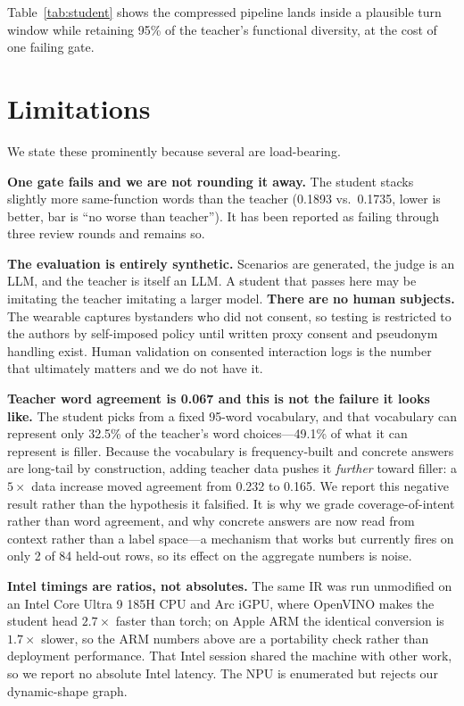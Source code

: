 \documentclass{article}
\begin{document}
Table~\ref{tab:student} shows the compressed pipeline lands inside a plausible
turn window while retaining 95\% of the teacher's functional diversity, at the
cost of one failing gate.

\section{Limitations}\label{sec:limits}

We state these prominently because several are load-bearing.

\textbf{One gate fails and we are not rounding it away.} The student stacks
slightly more same-function words than the teacher (0.1893 vs.\ 0.1735, lower is
better, bar is ``no worse than teacher''). It has been reported as failing
through three review rounds and remains so.

\textbf{The evaluation is entirely synthetic.} Scenarios are generated, the
judge is an LLM, and the teacher is itself an LLM. A student that passes here may
be imitating the teacher imitating a larger model. \textbf{There are no human
subjects.} The wearable captures bystanders who did not consent, so testing is
restricted to the authors by self-imposed policy until written proxy consent and
pseudonym handling exist. Human validation on consented interaction logs is the
number that ultimately matters and we do not have it.

\textbf{Teacher word agreement is 0.067 and this is not the failure it looks
like.} The student picks from a fixed 95-word vocabulary, and that vocabulary can
represent only 32.5\% of the teacher's word choices---49.1\% of what it can
represent is filler. Because the vocabulary is frequency-built and concrete
answers are long-tail by construction, adding teacher data pushes it
\emph{further} toward filler: a $5\times$ data increase moved agreement from
0.232 to 0.165. We report this negative result rather than the hypothesis it
falsified. It is why we grade coverage-of-intent rather than word agreement, and
why concrete answers are now read from context rather than a label space---a
mechanism that works but currently fires on only 2 of 84 held-out rows, so its
effect on the aggregate numbers is noise.

\textbf{Intel timings are ratios, not absolutes.} The same IR was run
unmodified on an Intel Core Ultra 9 185H CPU and Arc iGPU, where OpenVINO makes
the student head $2.7\times$ faster than torch; on Apple ARM the identical
conversion is $1.7\times$ slower, so the ARM numbers above are a portability
check rather than deployment performance. That Intel session shared the machine
with other work, so we report no absolute Intel latency. The NPU is enumerated
but rejects our dynamic-shape graph.
\end{document}
